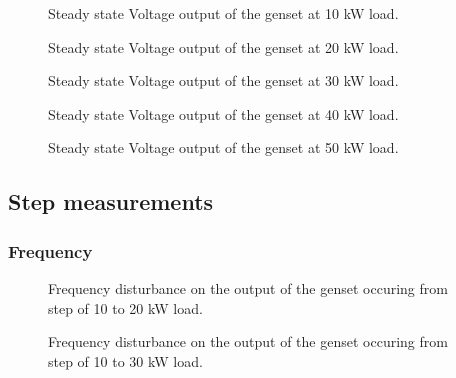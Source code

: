 \begin{figure}[H]
\centering

\caption{Steady state Voltage output of the genset at 10 kW load.}
\label{fig:test8-9steadyvolt10kw}
\end{figure}

\begin{figure}[H]
\centering

\caption{Steady state Voltage output of the genset at 20 kW load.}
\label{fig:test8-9steadyvolt20kw}
\end{figure}

\begin{figure}[H]
\centering

\caption{Steady state Voltage output of the genset at 30 kW load.}
\label{fig:test8-9steadyvolt30kw}
\end{figure}

\begin{figure}[H]
\centering

\caption{Steady state Voltage output of the genset at 40 kW load.}
\label{fig:test8-9steadyvolt40kw}
\end{figure}

\begin{figure}[H]
\centering

\caption{Steady state Voltage output of the genset at 50 kW load.}
\label{fig:test8-9steadyvolt50kw}
\end{figure}


\subsection*{Step measurements}
\subsubsection*{Frequency}
\begin{figure}[H]
\centering

\caption{Frequency disturbance on the output of the genset occuring from step of 10 to 20 kW load. }
\label{fig:test8-9-10to20kwstepfreq}
\end{figure}

\begin{figure}[H]
\centering

\caption{Frequency disturbance on the output of the genset occuring from step of 10 to 30 kW load.}
\label{fig:test8-9-10to30kwstepfreq}
\end{figure}

